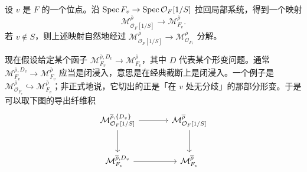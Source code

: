 设 $v$ 是 $F$ 的一个位点。沿 $\operatorname{Spec} F_v\to\operatorname{Spec}\mathcal O_F[1/S]$ 拉回局部系统，得到一个映射
\[
\mathcal M^{\overline\rho}_{\mathcal O_F[1/S]}\to \mathcal M^{\overline\rho}_{F_v}.
\]
若 $v\notin S$，则上述映射自然地经过 $\mathcal M^{\overline\rho}_{\mathcal O_F[1/S]}\to\mathcal M^{\overline\rho}_{\mathcal O_{F_v}}$ 分解。

现在假设给定某个函子 $\mathcal M^{\overline\rho,D_v}_{F_v}\to\mathcal M^{\overline\rho}_{F_v}$，其中 $D$ 代表某个形变问题。通常 $\mathcal M^{\overline\rho,D_v}_{F_v}\to\mathcal M^{\overline\rho}_{F_v}$ 应当是闭浸入，意思是在经典截断上是闭浸入。一个例子是 $\mathcal M^{\overline\rho}_{\mathcal O_{F_v}}\hookrightarrow\mathcal M^{\overline\rho}_{F_v}$；非正式地说，它切出的正是「在 $v$ 处无分歧」的那部分形变。于是可以取下图的导出纤维积
\[
\begin{tikzcd}[column sep=large, row sep=large]
\mathcal M^{\overline\rho,\{D_v\}}_{\mathcal O_F[1/S]}\arrow[r]\arrow[d] & \mathcal M^{\overline\rho}_{\mathcal O_F[1/S]}\arrow[d]\\
\mathcal M^{\overline\rho,D_v}_{F_v}\arrow[r] & \mathcal M^{\overline\rho}_{F_v}
\end{tikzcd}
\]

